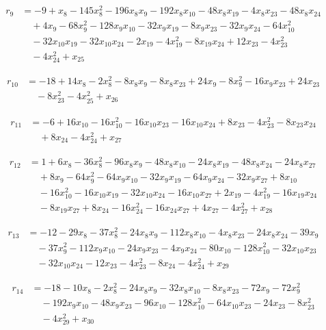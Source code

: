 \begin{align*}
r_{9}&=-9+x_{8}-145x_{8}^{2}-196x_{8}x_{9}-192x_{8}x_{10}-48x_{8}x_{19}-4x_{8}x_{23}-48x_{8}x_{24}\\
&\quad +4x_{9}-68x_{9}^{2}-128x_{9}x_{10}-32x_{9}x_{19}-8x_{9}x_{23}-32x_{9}x_{24}-64x_{10}^{2}\\
&\quad -32x_{10}x_{19}-32x_{10}x_{24}-2x_{19}-4x_{19}^{2}-8x_{19}x_{24}+12x_{23}-4x_{23}^{2}\\
&\quad -4x_{24}^{2}+x_{25}
\end{align*}

\begin{align*}
r_{10}&=-18+14x_{8}-2x_{8}^{2}-8x_{8}x_{9}-8x_{8}x_{23}+24x_{9}-8x_{9}^{2}-16x_{9}x_{23}+24x_{23}\\
&\quad -8x_{23}^{2}-4x_{25}^{2}+x_{26}
\end{align*}

\begin{align*}
r_{11}&=-6+16x_{10}-16x_{10}^{2}-16x_{10}x_{23}-16x_{10}x_{24}+8x_{23}-4x_{23}^{2}-8x_{23}x_{24}\\
&\quad +8x_{24}-4x_{24}^{2}+x_{27}
\end{align*}

\begin{align*}
r_{12}&=1+6x_{8}-36x_{8}^{2}-96x_{8}x_{9}-48x_{8}x_{10}-24x_{8}x_{19}-48x_{8}x_{24}-24x_{8}x_{27}\\
&\quad +8x_{9}-64x_{9}^{2}-64x_{9}x_{10}-32x_{9}x_{19}-64x_{9}x_{24}-32x_{9}x_{27}+8x_{10}\\
&\quad -16x_{10}^{2}-16x_{10}x_{19}-32x_{10}x_{24}-16x_{10}x_{27}+2x_{19}-4x_{19}^{2}-16x_{19}x_{24}\\
&\quad -8x_{19}x_{27}+8x_{24}-16x_{24}^{2}-16x_{24}x_{27}+4x_{27}-4x_{27}^{2}+x_{28}
\end{align*}

\begin{align*}
r_{13}&=-12-29x_{8}-37x_{8}^{2}-24x_{8}x_{9}-112x_{8}x_{10}-4x_{8}x_{23}-24x_{8}x_{24}-39x_{9}\\
&\quad -37x_{9}^{2}-112x_{9}x_{10}-24x_{9}x_{23}-4x_{9}x_{24}-80x_{10}-128x_{10}^{2}-32x_{10}x_{23}\\
&\quad -32x_{10}x_{24}-12x_{23}-4x_{23}^{2}-8x_{24}-4x_{24}^{2}+x_{29}
\end{align*}

\begin{align*}
r_{14}&=-18-10x_{8}-2x_{8}^{2}-24x_{8}x_{9}-32x_{8}x_{10}-8x_{8}x_{23}-72x_{9}-72x_{9}^{2}\\
&\quad -192x_{9}x_{10}-48x_{9}x_{23}-96x_{10}-128x_{10}^{2}-64x_{10}x_{23}-24x_{23}-8x_{23}^{2}\\
&\quad -4x_{29}^{2}+x_{30}
\end{align*}


